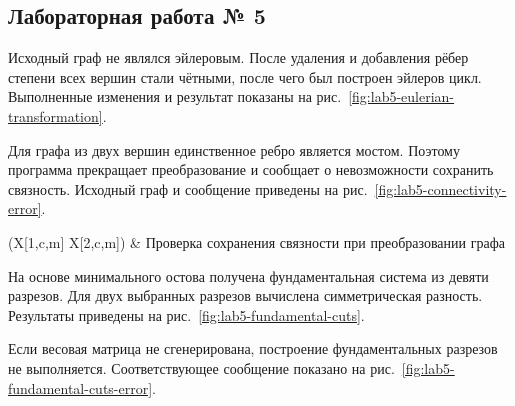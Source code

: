 \subsection{Лабораторная работа № 5}

Исходный граф не являлся эйлеровым. После удаления и добавления рёбер степени всех вершин стали чётными, после чего был построен эйлеров цикл. Выполненные изменения и результат показаны на рис.~\ref{fig:lab5-eulerian-transformation}.


Для графа из двух вершин единственное ребро является мостом. Поэтому программа прекращает преобразование и сообщает о невозможности сохранить связность. Исходный граф и сообщение приведены на рис.~\ref{fig:lab5-connectivity-error}.

\imgGrid[1ex](X[1,c,m] X[2,c,m]){
     &
}{Проверка сохранения связности при преобразовании графа}{\label{fig:lab5-connectivity-error}}

На основе минимального остова получена фундаментальная система из девяти разрезов. Для двух выбранных разрезов вычислена симметрическая разность. Результаты приведены на рис.~\ref{fig:lab5-fundamental-cuts}.


Если весовая матрица не сгенерирована, построение фундаментальных разрезов не выполняется. Соответствующее сообщение показано на рис.~\ref{fig:lab5-fundamental-cuts-error}.

